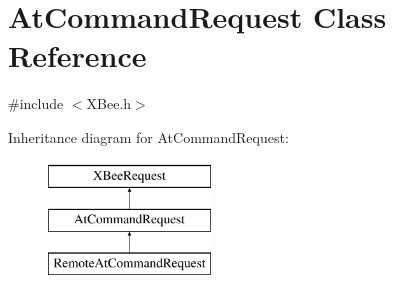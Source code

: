 \hypertarget{classAtCommandRequest}{\section{\-At\-Command\-Request \-Class \-Reference}
\label{classAtCommandRequest}
}


{\ttfamily \#include $<$\-X\-Bee.\-h$>$}

\-Inheritance diagram for \-At\-Command\-Request\-:\begin{figure}[H]
\begin{center}
\leavevmode
\includegraphics[height=3.000000cm]{classAtCommandRequest}
\end{center}
\end{figure}
